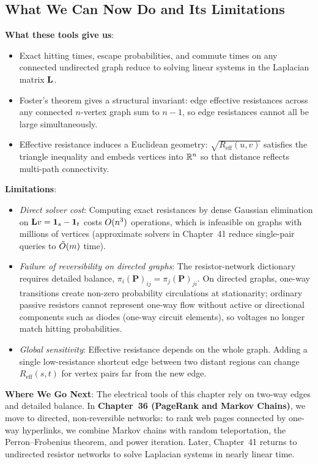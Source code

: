 \subsection{What We Can Now Do and Its Limitations}
\begin{connectionbox}
\textbf{What these tools give us}:
\begin{itemize}
  \item Exact hitting times, escape probabilities, and commute times on any connected undirected graph reduce to solving linear systems in the Laplacian matrix $\mathbf{L}$.
  \item Foster's theorem gives a structural invariant: edge effective resistances across any connected $n$-vertex graph sum to $n-1$, so edge resistances cannot all be large simultaneously.
  \item Effective resistance induces a Euclidean geometry: $\sqrt{R_{\mathrm{eff}}(u,v)}$ satisfies the triangle inequality and embeds vertices into $\mathbb{R}^n$ so that distance reflects multi-path connectivity.
\end{itemize}

\textbf{Limitations}:
\begin{itemize}
  \item \emph{Direct solver cost}: Computing exact resistances by dense Gaussian elimination on $\mathbf{L} v = \mathbf{1}_s - \mathbf{1}_t$ costs $O(n^3)$ operations, which is infeasible on graphs with millions of vertices (approximate solvers in Chapter~41 reduce single-pair queries to $\tilde{O}(m)$ time).
  \item \emph{Failure of reversibility on directed graphs}: The resistor-network dictionary requires detailed balance, $\pi_i (\mathbf{P})_{ij} = \pi_j (\mathbf{P})_{ji}$. On directed graphs, one-way transitions create non-zero probability circulations at stationarity; ordinary passive resistors cannot represent one-way flow without active or directional components such as diodes (one-way circuit elements), so voltages no longer match hitting probabilities.
  \item \emph{Global sensitivity}: Effective resistance depends on the whole graph. Adding a single low-resistance shortcut edge between two distant regions can change $R_{\mathrm{eff}}(s,t)$ for vertex pairs far from the new edge.
\end{itemize}

\textbf{Where We Go Next}:
The electrical tools of this chapter rely on two-way edges and detailed balance. In \textbf{Chapter~36 (PageRank and Markov Chains)}, we move to directed, non-reversible networks: to rank web pages connected by one-way hyperlinks, we combine Markov chains with random teleportation, the Perron--Frobenius theorem, and power iteration. Later, Chapter~41 returns to undirected resistor networks to solve Laplacian systems in nearly linear time.
\end{connectionbox}


